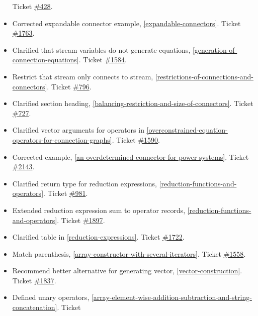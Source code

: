\begin{itemize}
  Ticket \href{https://github.com/modelica/ModelicaSpecification/issues/428}{\#428}.
\item
  Corrected expandable connector example, \cref{expandable-connectors}. Ticket
  \href{https://github.com/modelica/ModelicaSpecification/issues/1763}{\#1763}.
\item
  Clarified that stream variables do not generate equations, \cref{generation-of-connection-equations}.
  Ticket \href{https://github.com/modelica/ModelicaSpecification/issues/1584}{\#1584}.
\item
  Restrict that stream only connects to stream, \cref{restrictions-of-connections-and-connectors}. Ticket
  \href{https://github.com/modelica/ModelicaSpecification/issues/796}{\#796}.
\item
  Clarified section heading, \cref{balancing-restriction-and-size-of-connectors}. Ticket
  \href{https://github.com/modelica/ModelicaSpecification/issues/727}{\#727}.
\item
  Clarified vector arguments for operators in \cref{overconstrained-equation-operators-for-connection-graphs}. Ticket
  \href{https://github.com/modelica/ModelicaSpecification/issues/1590}{\#1590}.
\item
  Corrected example, \cref{an-overdetermined-connector-for-power-systems}. Ticket
  \href{https://github.com/modelica/ModelicaSpecification/issues/2143}{\#2143}.
\item
  Clarified return type for reduction expressions, \cref{reduction-functions-and-operators}.
  Ticket \href{https://github.com/modelica/ModelicaSpecification/issues/981}{\#981}.
\item
  Extended reduction expression sum to operator records, \cref{reduction-functions-and-operators}.
  Ticket \href{https://github.com/modelica/ModelicaSpecification/issues/1897}{\#1897}.
\item
  Clarified table in \cref{reduction-expressions}. Ticket
  \href{https://github.com/modelica/ModelicaSpecification/issues/1722}{\#1722}.
\item
  Match parenthesis, \cref{array-constructor-with-several-iterators}. Ticket
  \href{https://github.com/modelica/ModelicaSpecification/issues/1558}{\#1558}.
\item
  Recommend better alternative for generating vector, \cref{vector-construction}.
  Ticket \href{https://github.com/modelica/ModelicaSpecification/issues/1837}{\#1837}.
\item
  Defined unary operators, \cref{array-element-wise-addition-subtraction-and-string-concatenation}. Ticket

\end{itemize}
